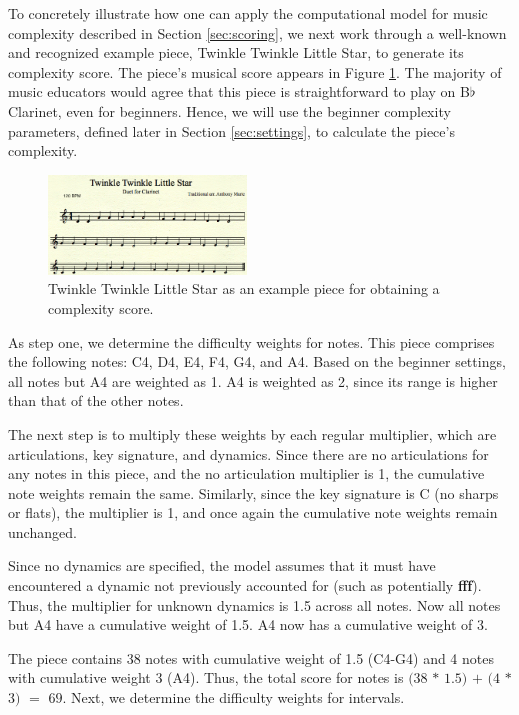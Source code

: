 \documentclass[10pt,preprint]{sigplanconf}
\begin{document}
To concretely illustrate how one can apply the computational model for music complexity described in Section \ref{sec:scoring}, we next work through a well-known and recognized example piece, Twinkle Twinkle Little Star, to generate its complexity score. The piece's musical score appears in Figure \ref{image:twinkle}. The majority of music educators would agree that this piece is straightforward to play on B$\flat$ Clarinet, even for beginners. Hence, we will use the beginner complexity parameters, defined later in Section \ref{sec:settings}, to calculate the piece's complexity. 

\begin{figure}
	\centering
		\includegraphics[width=0.47\textwidth]{TwinkleTwinkleLittleStarCropped.png}
		\caption{Twinkle Twinkle Little Star as an example piece for obtaining a complexity score.}
		\label{image:twinkle}
\end{figure}

As step one, we determine the difficulty weights for notes. This piece comprises the following notes: C4, D4, E4, F4, G4, and A4. Based on the beginner settings, all notes but A4 are weighted as 1. A4 is weighted as 2, since its range is higher than that of the other notes.

The next step is to multiply these weights by each regular multiplier, which are articulations, key signature, and dynamics. Since there are no articulations for any notes in this piece, and the no articulation multiplier is 1, the cumulative note weights remain the same. Similarly, since the key signature is C (no sharps or flats), the multiplier is 1, and once again the cumulative note weights remain unchanged.

Since no dynamics are specified, the model assumes that it must have encountered a dynamic not previously accounted for (such as potentially \textbf{fff}). Thus, the multiplier for unknown dynamics is 1.5 across all notes. Now all notes but A4 have a cumulative weight of 1.5. A4 now has a cumulative weight of 3.

The piece contains 38 notes with cumulative weight of 1.5 (C4-G4) and 4 notes with cumulative weight 3 (A4). Thus, the total score for notes is $(38$ $*$ $1.5)$ $+$ $(4$ $*$ $3)$ $=$ $69$. Next, we determine the difficulty weights for intervals.
\end{document}
